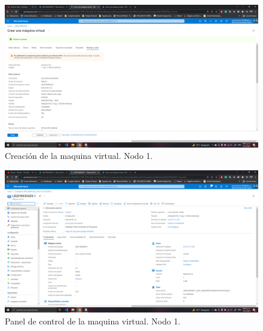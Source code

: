 \documentclass[11pt]{article}
\begin{document}
		\begin{figure}[H]
			\centering
			\includegraphics[scale=0.34]{resources/revisarycrear1.png}
			\caption{Creación de la maquina virtual. Nodo 1.}\label{fig:picture}
		\end{figure}
		\begin{figure}[H]
			\centering
			\includegraphics[scale=0.34]{resources/Panelcontrol1.png}
			\caption{Panel de control de la maquina virtual. Nodo 1.}\label{fig:picture}
		\end{figure}
		
\end{document}
